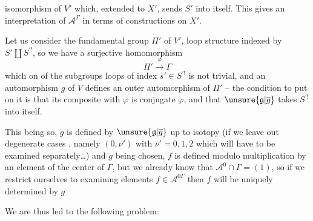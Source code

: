 
isomorphism of $V'$ which, extended to $X'$, sends $S'$ into itself. This gives an interpretation of $\mathcal A^\Gamma$ in terms of constructions on $X'$.

Let us consider the fundamental group $\Pi'$ of $V'$,  loop structure indexed by $S'\amalg S^{\prime!}$, so we have a surjective homomorphism
\[
\Pi'\xrightarrow{\varphi}\Gamma
\]
which on  of the subgroups  loops of index $s'\in S^{\prime!}$ is not trivial, and an automorphism $g$ of $V$ defines an outer automorphism  of $\Pi'$ -- the condition to put on it is that its composite with $\varphi$ is conjugate  $\varphi$, and that $\unsure{\mathfrak g|\overline g}$ takes $S^{\prime!}$ into itself.


This being so,  $g$ is defined by $\unsure{\mathfrak g|\overline g}$ up to isotopy  (if we leave out degenerate cases  , namely $(0,\nu')$ with $\nu'=0,1,2$ which will have to be examined separately\ldots) and $g$ being chosen, $f$ is defined modulo multiplication by an element of the center of $\Gamma$, but we already know that $\mathcal A^0\cap\Gamma=(1)$, so if we restrict ourselves to examining elements $f\in\mathcal A^{0\Gamma}$ then $f$ will be uniquely determined by $g$


We are thus led to the following problem:

